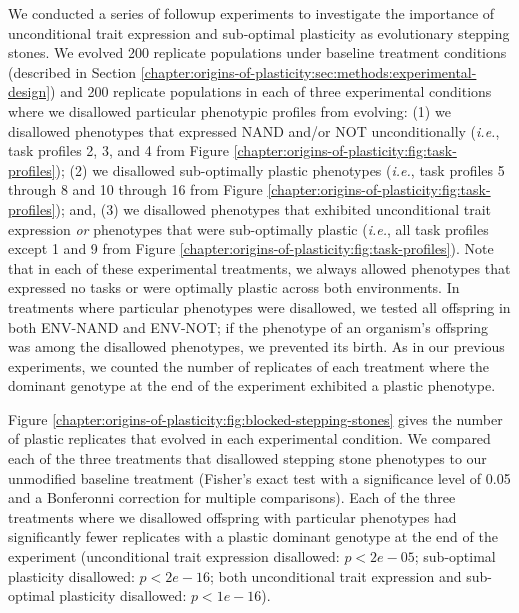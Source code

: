 We conducted a series of followup experiments to investigate the importance of unconditional trait expression and sub-optimal plasticity as evolutionary stepping stones.
We evolved 200 replicate populations under baseline treatment conditions (described in Section \ref{chapter:origins-of-plasticity:sec:methods:experimental-design}) and 200 replicate populations in each of three experimental conditions where we disallowed particular phenotypic profiles from evolving: (1) we disallowed phenotypes that expressed NAND and/or NOT unconditionally (\textit{i.e.}, task profiles 2, 3, and 4 from Figure \ref{chapter:origins-of-plasticity:fig:task-profiles}); (2) we disallowed sub-optimally plastic phenotypes (\textit{i.e.}, task profiles 5 through 8 and 10 through 16 from Figure \ref{chapter:origins-of-plasticity:fig:task-profiles}); and, (3) we disallowed phenotypes that exhibited unconditional trait expression \textit{or} phenotypes that were sub-optimally plastic (\textit{i.e.}, all task profiles except 1 and 9 from Figure \ref{chapter:origins-of-plasticity:fig:task-profiles}).
Note that in each of these experimental treatments, we always allowed phenotypes that expressed no tasks or were optimally plastic across both environments.
In treatments where particular phenotypes were disallowed, we tested all offspring in both ENV-NAND and ENV-NOT; if the phenotype of an organism's offspring was among the disallowed phenotypes, we prevented its birth.
As in our previous experiments, we counted the number of replicates of each treatment where the dominant genotype at the end of the experiment exhibited a plastic phenotype.



Figure \ref{chapter:origins-of-plasticity:fig:blocked-stepping-stones} gives the number of plastic replicates that evolved in each experimental condition.
We compared each of the three treatments that disallowed stepping stone phenotypes to our unmodified baseline treatment (Fisher's exact test with a significance level of 0.05 and a Bonferonni correction for multiple comparisons).
Each of the three treatments where we disallowed offspring with particular phenotypes had significantly fewer replicates with a plastic dominant genotype at the end of the experiment (unconditional trait expression disallowed: $p < 2e-05$; sub-optimal plasticity disallowed: $p<2e-16$; both unconditional trait expression and sub-optimal plasticity disallowed: $p<1e-16$).

